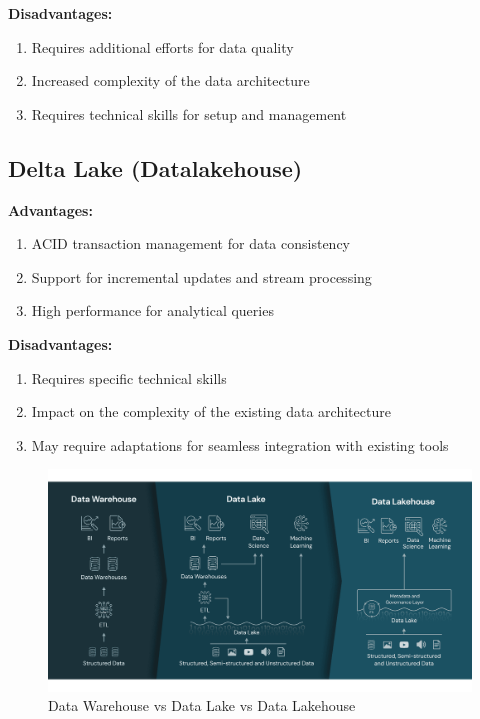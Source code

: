 \textbf{Disadvantages:}
\begin{enumerate}
\item Requires additional efforts for data quality
\item Increased complexity of the data architecture
\item Requires technical skills for setup and management
\end{enumerate}

\subsection{Delta Lake (Datalakehouse)}
\textbf{Advantages:}
\begin{enumerate}
\item ACID transaction management for data consistency
\item Support for incremental updates and stream processing
\item High performance for analytical queries
\end{enumerate}

\textbf{Disadvantages:}
\begin{enumerate}
\item Requires specific technical skills
\item Impact on the complexity of the existing data architecture
\item May require adaptations for seamless integration with existing tools

\end{enumerate}

\begin{figure}[H]
\centering
\includegraphics[width=\linewidth]{images/data-warehouse-data-lake-datalakehouse.png}
\caption{Data Warehouse vs Data Lake vs Data Lakehouse}\label{fig:data-warehouse-data-lake-datalakehouse}
\end{figure}

